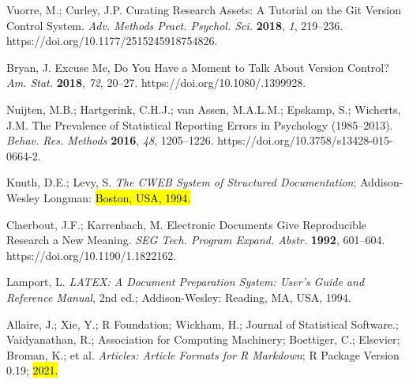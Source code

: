 \documentclass[psych,tutorial,accept,moreauthors,pdftex]{Definitions/mdpi}
\begin{document}
\begin{thebibliography}{999}
Vuorre, M.; Curley, J.P. Curating Research Assets: A Tutorial on the Git Version Control System. \emph{Adv. Methods Pract. Psychol. Sci.} \textbf{2018}, \emph{1}, 219--236. https://doi.org/10.1177/2515245918754826.

Bryan, J. Excuse Me, Do You Have a Moment to Talk About Version Control? \emph{Am. Stat.} \textbf{2018}, \emph{72}, 20--27. https://doi.org/10.1080/.1399928.

Nuijten, M.B.; Hartgerink, C.H.J.; van Assen, M.A.L.M.; Epskamp, S.; Wicherts, J.M. The Prevalence of Statistical Reporting Errors in Psychology (1985--2013). \emph{Behav. Res. Methods} \textbf{2016}, \emph{48}, 1205--1226. https://doi.org/10.3758/s13428-015-0664-2.

Knuth, D.E.; Levy, S. \emph{The CWEB System of Structured Documentation}; Addison-Wesley Longman: \hl{Boston, USA, 1994.}%


Claerbout, J.F.; Karrenbach, M. Electronic Documents Give Reproducible Research a New Meaning. \emph{SEG Tech. Program Expand. Abstr.} \textbf{1992}, 601--604. https://doi.org/10.1190/1.1822162.


Lamport, L. \emph{LATEX: A Document Preparation System: User’s Guide and Reference Manual}, 2nd ed.; Addison-Wesley: Reading, MA, USA, 1994.


Allaire, J.; Xie, Y.; R Foundation; Wickham, H.; Journal of Statistical Software.; Vaidyanathan, R.; Association for Computing Machinery; Boettiger, C.; Elsevier; Broman, K.; et al. \emph{Articles: Article Formats for R Markdown}; R Package Version 0.19; \hl{2021.}%



\end{thebibliography}
\end{document}
